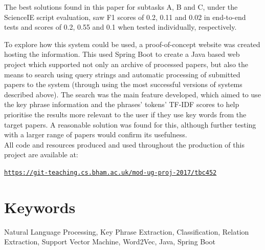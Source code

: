 \documentclass[a4paper]{report}
\begin{document}
The best solutions found in this paper for subtasks A, B and C, under the ScienceIE script evaluation, saw F1 scores of 0.2, 0.11 and 0.02 in end-to-end tests and scores of 0.2, 0.55 and 0.1 when tested individually, respectively. 

To explore how this system could be used, a proof-of-concept website was created hosting the information. This used Spring Boot to create a Java based web project which supported not only an archive of processed papers, but also the means to search using query strings and automatic processing of submitted papers to the system (through using the most successful versions of systems described above). The search was the main feature developed, which aimed to use the key phrase information and the phrases' tokens' TF-IDF scores to help prioritise the results more relevant to the user if they use key words from the target papers. A reasonable solution was found for this, although further testing with a larger range of papers would confirm its usefulness. \\

\noindent All code and resources produced and used throughout the production of this project are available at:
\begin{center}
	\texttt{\href{https://git-teaching.cs.bham.ac.uk/mod-ug-proj-2017/tbc452}{https://git-teaching.cs.bham.ac.uk/mod-ug-proj-2017/tbc452}}
\end{center}

\section*{Keywords}
Natural Language Processing, Key Phrase Extraction, Classification, Relation Extraction, Support Vector Machine, Word2Vec, Java, Spring Boot

\pagebreak

\tableofcontents
\listoffigures
\listoftables
\pagebreak




\pagebreak

\pagebreak

\pagebreak

\pagebreak

\pagebreak

\pagebreak

\pagebreak


\pagebreak



\pagebreak

\end{document}

